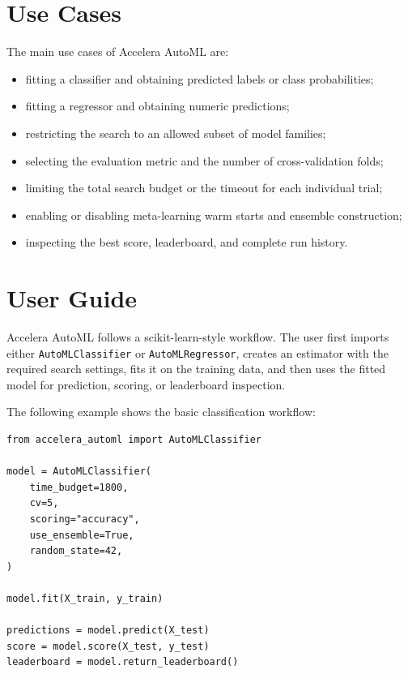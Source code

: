 \documentclass[12pt,a4paper,oneside]{report}
\newcommand{\systemname}{Accelera AutoML}
\begin{document}
\chapter{Use Cases}

The main use cases of \systemname{} are:

\begin{itemize}
  \item fitting a classifier and obtaining predicted labels or class
        probabilities;
  \item fitting a regressor and obtaining numeric predictions;
  \item restricting the search to an allowed subset of model families;
  \item selecting the evaluation metric and the number of cross-validation
        folds;
  \item limiting the total search budget or the timeout for each individual
        trial;
  \item enabling or disabling meta-learning warm starts and ensemble
        construction;
  \item inspecting the best score, leaderboard, and complete run history.
\end{itemize}

\chapter{User Guide}

\systemname{} follows a scikit-learn-style workflow. The user first imports
either \texttt{AutoMLClassifier} or \texttt{AutoMLRegressor}, creates an
estimator with the required search settings, fits it on the training data, and
then uses the fitted model for prediction, scoring, or leaderboard inspection.

\noindent The following example shows the basic classification workflow:

\begin{lstlisting}[style=pythonstyle]
from accelera_automl import AutoMLClassifier

model = AutoMLClassifier(
    time_budget=1800,
    cv=5,
    scoring="accuracy",
    use_ensemble=True,
    random_state=42,
)

model.fit(X_train, y_train)

predictions = model.predict(X_test)
score = model.score(X_test, y_test)
leaderboard = model.return_leaderboard()
\end{lstlisting}
\end{document}
